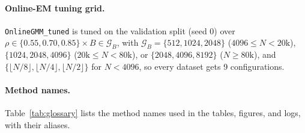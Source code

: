 \documentclass[10pt]{article} %
\begin{document}
\paragraph{Online-EM tuning grid.} \texttt{OnlineGMM\_tuned} is tuned on the validation split (seed 0) over $\rho \in \{0.55, 0.70, 0.85\} \times B \in \mathcal{G}_B$, with $\mathcal{G}_B = \{512, 1024, 2048\}$ ($4096 \le N < 20\text{k}$), $\{1024, 2048, 4096\}$ ($20\text{k} \le N < 80\text{k}$), or $\{2048, 4096, 8192\}$ ($N \ge 80\text{k}$), and $\{\lfloor N/8 \rfloor, \lfloor N/4 \rfloor, \lfloor N/2 \rfloor\}$ for $N < 4096$, so every dataset gets 9 configurations.

\paragraph{Method names.} Table~\ref{tab:glossary} lists the method names used in the tables, figures, and logs, with their aliases.
\end{document}
